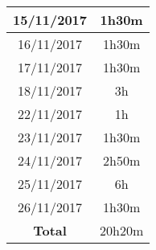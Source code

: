 \begin{tabular}{|c|c|}

	\hline

15/11/2017	& 1h30m \\ 

	\hline 

16/11/2017	& 1h30m \\ 

	\hline 

17/11/2017	& 1h30m \\ 

	\hline 

18/11/2017	& 3h \\ 

	\hline 

22/11/2017	& 1h \\ 

	\hline 

23/11/2017	& 1h30m \\ 

	\hline 

24/11/2017	& 2h50m \\ 

	\hline 

25/11/2017	& 6h \\ 

	\hline

26/11/2017	& 1h30m \\ 

	\hline

\textbf{Total}	& 20h20m \\

	\hline

\end{tabular}